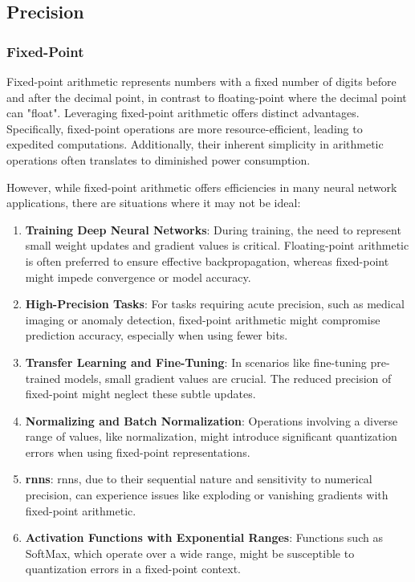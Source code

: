 \subsection{Precision}
\subsubsection{Fixed-Point}

Fixed-point arithmetic represents numbers with a fixed number of digits before and after the decimal point, in contrast to floating-point where the decimal point can "float". Leveraging fixed-point arithmetic offers distinct advantages. Specifically, fixed-point operations are more resource-efficient, leading to expedited computations. Additionally, their inherent simplicity in arithmetic operations often translates to diminished power consumption. 


However, while fixed-point arithmetic offers efficiencies in many neural network applications, there are situations where it may not be ideal:

\begin{enumerate}
	\item \textbf{Training Deep Neural Networks}: During training, the need to represent small weight updates and gradient values is critical. Floating-point arithmetic is often preferred to ensure effective backpropagation, whereas fixed-point might impede convergence or model accuracy.
	
	\item \textbf{High-Precision Tasks}: For tasks requiring acute precision, such as medical imaging or anomaly detection, fixed-point arithmetic might compromise prediction accuracy, especially when using fewer bits.
	
	\item \textbf{Transfer Learning and Fine-Tuning}: In scenarios like fine-tuning pre-trained models, small gradient values are crucial. The reduced precision of fixed-point might neglect these subtle updates.
	
	\item \textbf{Normalizing and Batch Normalization}: Operations involving a diverse range of values, like normalization, might introduce significant quantization errors when using fixed-point representations.
	
	\item \textbf{\glspl{rnn}}: \glspl{rnn}, due to their sequential nature and sensitivity to numerical precision, can experience issues like exploding or vanishing gradients with fixed-point arithmetic.
	
	\item \textbf{Activation Functions with Exponential Ranges}: Functions such as SoftMax, which operate over a wide range, might be susceptible to quantization errors in a fixed-point context.
\end{enumerate}

